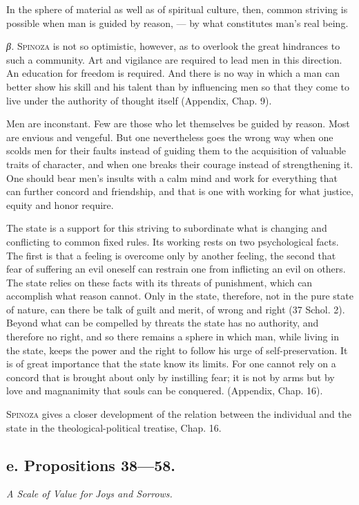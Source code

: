 \documentclass[12pt]{article}
\newcommand{\opage}[1]{\marginnote{\footnotesize\textit{[#1]}}}
\begin{document}
In the sphere of material as well as of spiritual culture, then, common \opage{78}striving is
possible when man is guided by reason, --- by what constitutes man's real being.

\textit{β.} \textsc{Spinoza} is not so optimistic, however, as to overlook the great hindrances to
such a community. Art and vigilance are required to lead men in this direction. An education for
freedom is required. And there is no way in which a man can better show his skill and his talent
than by influencing men so that they come to live under the authority of thought itself
(Appendix, Chap. 9).

Men are inconstant. Few are those who let themselves be guided by reason. Most are envious and
vengeful. But one nevertheless goes the wrong way when one scolds men for their faults instead of
guiding them to the acquisition of valuable traits of character, and when one breaks their courage
instead of strengthening it. One should bear men's insults with a calm mind and work for everything
that can further concord and friendship, and that is one with working for what justice, equity and
honor require.

The state is a support for this striving to subordinate what is changing and conflicting to common
fixed rules. Its working rests on two psychological facts. The first is that a feeling is overcome
only by another feeling, the second that fear of suffering an evil oneself can restrain one from
inflicting an evil on others. The state relies on these facts with its threats of punishment,
which can accomplish what reason cannot. Only in the state, therefore, not in the pure state of
nature, can there be talk of guilt and merit, of wrong and right (37 Schol. 2). Beyond what can be
compelled by threats the state has no authority, and therefore no right, and so there remains a
sphere in which man, while living in the state, keeps the power and the right to follow his urge
of self-preservation. It is of great importance that the state know its limits. For one cannot
rely on a concord that is brought about only by instilling fear; it is not by arms but by love and
magnanimity that souls can be conquered. (Appendix, Chap. 16).

\textsc{Spinoza} gives a closer development of the relation between the individual and the state
in the theological-political treatise, Chap. 16.

\subsection*{e. Propositions 38---58.}
\begin{center}\textit{A Scale of Value for Joys and Sorrows.}\end{center}
\end{document}
